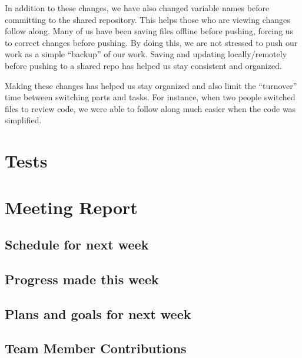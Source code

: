 \documentclass[12pt]{article}
\begin{document}
    In addition to these changes, we have also changed variable names before committing to the shared repository. This helps those who are viewing changes follow along. Many of us have been saving files offline before pushing, forcing us to correct changes before pushing. By doing this, we are not stressed to push our work as a simple “backup” of our work. Saving and updating locally/remotely before pushing to a shared repo has helped us stay consistent and organized.

    Making these changes has helped us stay organized and also limit the “turnover” time between switching parts and tasks. For instance, when two people switched files to review code, we were able to follow along much easier when the code was simplified. 


\section{Tests}



\section{Meeting Report}
\subsection{Schedule for next week}

\subsection{Progress made this week}

\subsection{Plans and goals for next week}
\subsection{Team Member Contributions}
\end{document}
